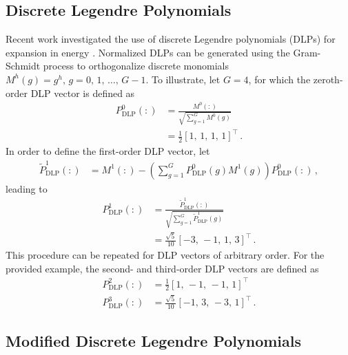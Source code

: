 \documentclass[5p,times,twocolumn,10pt]{elsarticle}
\begin{document}
  \subsection{Discrete Legendre Polynomials}
  
  Recent work investigated the use of discrete Legendre polynomials (DLPs) 
  for expansion in energy \cite{Roberts2014}.  
  Normalized DLPs can be generated using the Gram-Schmidt process to 
  orthogonalize
  discrete monomials $M^h(g) =  g^h,\, g=0,\,1,\,\ldots,\, G-1$. 
  To illustrate, let $G=4$, for which the zeroth-order DLP vector is defined as
  \begin{equation}
    \begin{split}
      P_{\text{DLP}}^0(:) &= \frac{M^0(:)}{\sqrt{\sum_{g=1}^{G} M^0(g)}} \\
      &= \frac{1}{2}[1,\,1,\,1,\,1]^{\intercal} \, .
    \end{split}
  \end{equation}
  In order to define the  first-order DLP vector, let
  \begin{equation}
    \begin{split}
      \tilde{P}_{\text{DLP}}^1(:) &= M^1(:) - \left ( \sum_{g=1}^{G} P_{\text{DLP}}^0(g) M^1(g) \right ) P_{\text{DLP}}^0(:)   \, ,
    \end{split}
  \end{equation}
  leading to
  \begin{equation}
    \begin{split}
      P_{\text{DLP}}^1(:) &= \frac{\tilde{P}_{\text{DLP}}^1(:)}{\sqrt{\sum_{g=1}^{G} \tilde{P}_{\text{DLP}}^1(g)}} \\
      &= \frac{\sqrt{5}}{10} [-3,\,-1,\,1,\,3]^{\intercal} \, .
    \end{split}
  \end{equation}
  This procedure can be repeated for DLP vectors of arbitrary order. 
  For the provided example, the second- and third-order DLP
  vectors are defined as
  \begin{equation}
    \begin{split}
      P_{\text{DLP}}^2(:)  &= \frac{1}{2} [1,\,-1,\,-1,\,1]^{\intercal} \\
      P_{\text{DLP}}^3(:)  &= \frac{\sqrt{5}}{10} [-1,\,3,\,-3,\,1]^{\intercal} \, .
    \end{split}
  \end{equation}
  
  \subsection{Modified Discrete Legendre Polynomials}
  
\end{document}
